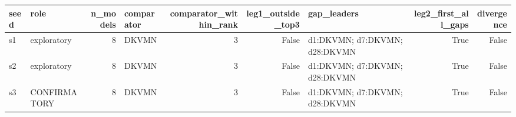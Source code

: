\begin{tabular}{llrlrrlrr}
\toprule
seed & role & n\_models & comparator & comparator\_within\_rank & leg1\_outside\_top3 & gap\_leaders & leg2\_first\_all\_gaps & divergence \\
\midrule
s1 & exploratory & 8 & DKVMN & 3 & False & d1:DKVMN; d7:DKVMN; d28:DKVMN & True & False \\
s2 & exploratory & 8 & DKVMN & 3 & False & d1:DKVMN; d7:DKVMN; d28:DKVMN & True & False \\
s3 & CONFIRMATORY & 8 & DKVMN & 3 & False & d1:DKVMN; d7:DKVMN; d28:DKVMN & True & False \\
\bottomrule
\end{tabular}
